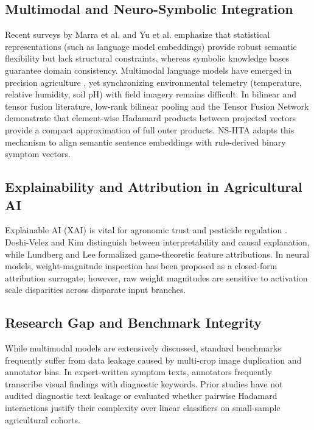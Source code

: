 \documentclass[conference]{IEEEtran}
\begin{document}
\subsection{Multimodal and Neuro-Symbolic Integration}
Recent surveys by Marra et al. \cite{marra2024} and Yu et al. \cite{yu2023} emphasize that statistical representations (such as language model embeddings) provide robust semantic flexibility but lack structural constraints, whereas symbolic knowledge bases guarantee domain consistency. Multimodal language models have emerged in precision agriculture \cite{zhu2025}, yet synchronizing environmental telemetry (temperature, relative humidity, soil pH) with field imagery remains difficult. In bilinear and tensor fusion literature, low-rank bilinear pooling \cite{kim2017} and the Tensor Fusion Network \cite{zadeh2017} demonstrate that element-wise Hadamard products between projected vectors provide a compact approximation of full outer products. NS-HTA adapts this mechanism to align semantic sentence embeddings with rule-derived binary symptom vectors.

\subsection{Explainability and Attribution in Agricultural AI}
Explainable AI (XAI) is vital for agronomic trust and pesticide regulation \cite{pai2025, porfirio2025}. Doshi-Velez and Kim \cite{doshivelez2017} distinguish between interpretability and causal explanation, while Lundberg and Lee \cite{lundberg2017} formalized game-theoretic feature attributions. In neural models, weight-magnitude inspection has been proposed as a closed-form attribution surrogate; however, raw weight magnitudes are sensitive to activation scale disparities across disparate input branches.

\subsection{Research Gap and Benchmark Integrity}
While multimodal models are extensively discussed, standard benchmarks frequently suffer from data leakage caused by multi-crop image duplication and annotator bias. In expert-written symptom texts, annotators frequently transcribe visual findings with diagnostic keywords. Prior studies have not audited diagnostic text leakage or evaluated whether pairwise Hadamard interactions justify their complexity over linear classifiers on small-sample agricultural cohorts.
\end{document}
